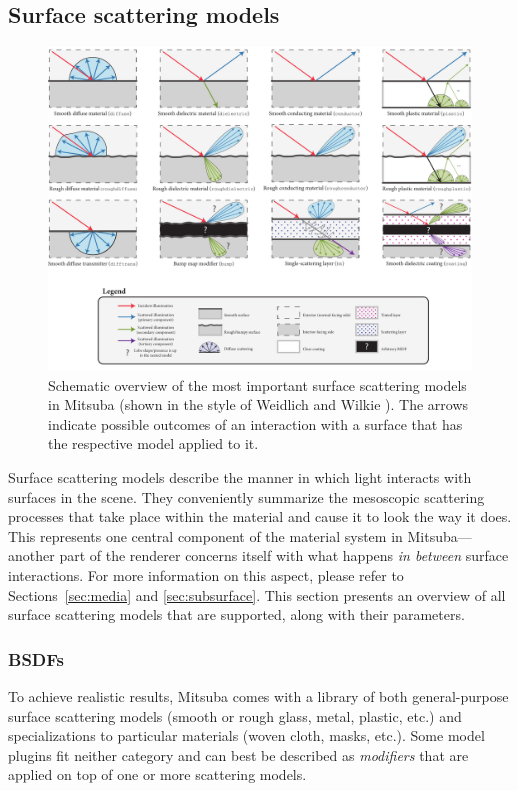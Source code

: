\newpage
\subsection{Surface scattering models}
\begin{figure}[h!]
\centering
\includegraphics[width=15.5cm]{images/bsdf_overview.pdf}
\caption{
	Schematic overview of the most important surface scattering models in
	Mitsuba (shown in the style of Weidlich and Wilkie \cite{Weidlich2007Arbitrarily}). The arrows indicate possible outcomes of an
	interaction with a surface that has the respective model applied to it.
	\vspace{4mm}
}
\end{figure}

\label{sec:bsdfs}
Surface scattering models describe the manner in which light interacts
with surfaces in the scene. They conveniently summarize the mesoscopic 
scattering processes that take place within the material and 
cause it to look the way it does.
This represents one central component of the material system in Mitsuba---another 
part of the renderer concerns itself with what happens 
\emph{in between} surface interactions. For more information on this aspect, 
please refer to Sections~\ref{sec:media} and \ref{sec:subsurface}.
This section presents an overview of all surface scattering models that are 
supported, along with their parameters.

\subsubsection*{BSDFs}
To achieve realistic results, Mitsuba comes with a library of both 
general-purpose surface scattering models (smooth or rough glass, metal,
plastic, etc.) and specializations to particular materials (woven cloth,
masks, etc.). Some model plugins fit neither category and can best be described
as \emph{modifiers} that are applied on top of one or more scattering models. 

